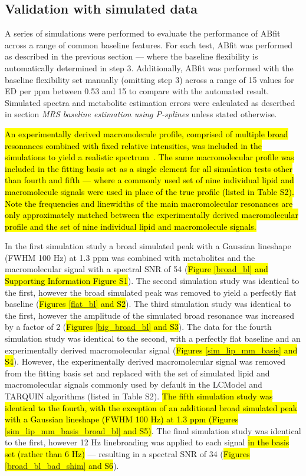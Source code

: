 \documentclass[num-refs]{wiley-article}
\newcommand{\revone}[2]{\hl{#1}\marginnote{\hl{#2}}}
\begin{document}
\subsection{Validation with simulated data}
A series of simulations were performed to evaluate the performance of ABfit across a range of common baseline features. For each test, ABfit was performed as described in the previous section --- where the baseline flexibility is automatically determined in step 3. Additionally, ABfit was performed with the baseline flexibility set manually (omitting step 3) across a range of 15 values for ED per ppm between 0.53 and 15 to compare with the automated result. Simulated spectra and metabolite estimation errors were calculated as described in section \textit{MRS baseline estimation using P-splines} unless stated otherwise.

\revone{An experimentally derived macromolecule profile, comprised of multiple broad resonances combined with fixed relative intensities, was included in the simulations to yield a realistic spectrum~\cite{Birch2017}. The same macromolecular profile was included in the fitting basis set as a single element for all simulation tests other than fourth and fifth --- where a commonly used set of nine individual lipid and macromolecule signals were used in place of the true profile (listed in Table S2). Note the frequencies and linewidths of the main macromolecular resonances are only approximately matched between the experimentally derived macromolecular profile and the set of nine individual lipid and macromolecule signals.}{R1.1}

In the first simulation study a broad simulated peak with a Gaussian lineshape (FWHM 100 Hz) at 1.3 ppm was combined with metabolites and the macromolecular signal with a spectral SNR of 54 (\revone{Figure \ref{broad_bl} and Supporting Information Figure S1}{R1.22}). The second simulation study was identical to the first, however the broad simulated peak was removed to yield a perfectly flat baseline (\revone{Figures \ref{flat_bl} and S2}{R1.22}). The third simulation study was identical to the first, however the amplitude of the simulated broad resonance was increased by a factor of 2 (\revone{Figures \ref{big_broad_bl} and S3}{R1.22}). The data for the fourth simulation study was identical to the second, with a perfectly flat baseline and an experimentally derived macromolecular signal (\revone{Figures \ref{sim_lip_mm_basis} and S4}{R1.22}). However, the experimentally derived macromolecular signal was removed from the fitting basis set and replaced with the set of simulated lipid and macromolecular signals commonly used by default in the LCModel and TARQUIN algorithms (listed in Table S2). \revone{The fifth simulation study was identical to the fourth, with the exception of an additional broad simulated peak with a Gaussian lineshape (FWHM 100 Hz) at 1.3 ppm (Figures \ref{sim_lip_mm_basis_broad_bl} and S5)}{R1.3}. The final simulation study was identical to the first, however 12 Hz linebroading was applied to each signal \revone{in the basis set (rather than 6 Hz)}{R2.10} --- resulting in a spectral SNR of 34 (\revone{Figures \ref{broad_bl_bad_shim} and S6}{R1.22}).
\end{document}
